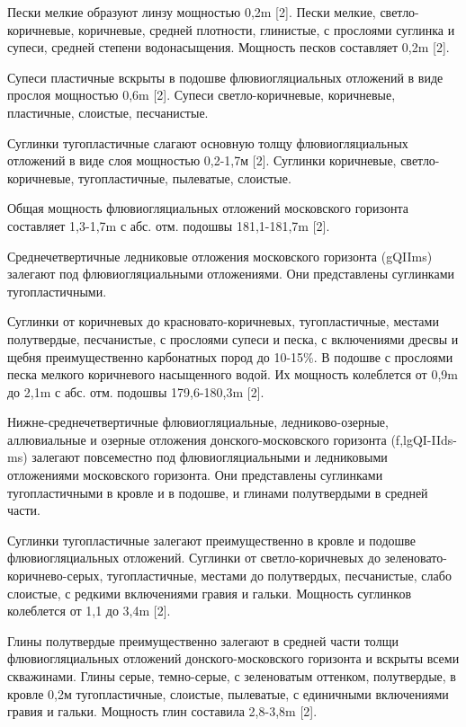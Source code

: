 Пески мелкие образуют линзу мощностью 0,2\si{\meter} [2]. Пески мелкие, светло-коричневые, коричневые, средней плотности, глинистые, с прослоями суглинка и супеси, средней степени водонасыщения. Мощность песков составляет 0,2\si{\meter} [2].

Супеси пластичные вскрыты в подошве флювиогляциальных отложений в виде прослоя мощностью 0,6\si{\meter} [2]. Супеси светло-коричневые, коричневые, пластичные, слоистые, песчанистые.

Суглинки тугопластичные слагают основную толщу флювиогляциальных отложений в виде слоя мощностью 0,2-1,7м [2]. Суглинки коричневые, светло-коричневые, тугопластичные, пылеватые, слоистые.

Общая мощность флювиогляциальных отложений московского горизонта составляет 1,3-1,7\si{\meter} с абс. отм. подошвы 181,1-181,7\si{\meter} [2].

Среднечетвертичные ледниковые отложения московского горизонта (gQIIms) залегают под флювиогляциальными отложениями. Они представлены суглинками тугопластичными.

Суглинки от коричневых до красновато-коричневых, тугопластичные, местами полутвердые, песчанистые, с прослоями супеси и песка, с включениями дресвы и щебня преимущественно карбонатных пород до 10-15\%. В подошве с прослоями песка мелкого коричневого насыщенного водой. Их мощность колеблется от 0,9\si{\meter} до 2,1\si{\meter} с абс. отм. подошвы 179,6-180,3\si{\meter} [2].

Нижне-среднечетвертичные флювиогляциальные, ледниково-озерные, аллювиальные и озерные отложения донского-московского горизонта (f,lgQI-IIds-ms) залегают повсеместно под флювиогляциальными и ледниковыми отложениями московского горизонта. Они представлены суглинками тугопластичными в кровле и в подошве, и глинами полутвердыми в средней части.

Суглинки тугопластичные залегают преимущественно в кровле и подошве флювиогляциальных отложений. Суглинки от светло-коричневых до зеленовато-коричнево-серых, тугопластичные, местами до полутвердых, песчанистые, слабо слоистые, с редкими включениями гравия и гальки. Мощность суглинков колеблется от 1,1 до 3,4\si{\meter} [2].

Глины полутвердые преимущественно залегают в средней части толщи флювиогляциальных отложений донского-московского горизонта и вскрыты всеми скважинами. Глины серые, темно-серые, с зеленоватым оттенком, полутвердые, в кровле 0,2м тугопластичные, слоистые, пылеватые, с единичными включениями гравия и гальки. Мощность глин составила 2,8-3,8\si{\meter} [2].

